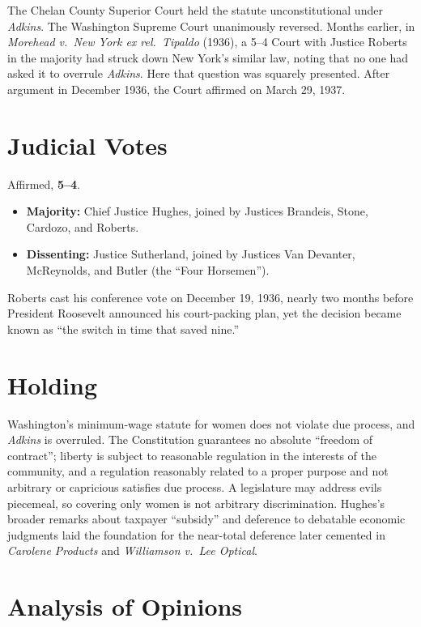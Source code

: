 \documentclass[12pt]{article}
\begin{document}
The Chelan County Superior Court held the statute unconstitutional under \textit{Adkins}. The Washington Supreme Court unanimously reversed. Months earlier, in \textit{Morehead v.\ New York ex rel.\ Tipaldo} (1936), a 5--4 Court with Justice Roberts in the majority had struck down New York's similar law, noting that no one had asked it to overrule \textit{Adkins}. Here that question was squarely presented. After argument in December 1936, the Court affirmed on March 29, 1937.

\section{Judicial Votes}

Affirmed, \textbf{5--4}.
\begin{itemize}
\item \textbf{Majority:} Chief Justice Hughes, joined by Justices Brandeis, Stone, Cardozo, and Roberts.
\item \textbf{Dissenting:} Justice Sutherland, joined by Justices Van Devanter, McReynolds, and Butler (the ``Four Horsemen'').
\end{itemize}
Roberts cast his conference vote on December 19, 1936, nearly two months before President Roosevelt announced his court-packing plan, yet the decision became known as ``the switch in time that saved nine.''

\section{Holding}

Washington's minimum-wage statute for women does not violate due process, and \textit{Adkins} is overruled. The Constitution guarantees no absolute ``freedom of contract''; liberty is subject to reasonable regulation in the interests of the community, and a regulation reasonably related to a proper purpose and not arbitrary or capricious satisfies due process. A legislature may address evils piecemeal, so covering only women is not arbitrary discrimination. Hughes's broader remarks about taxpayer ``subsidy'' and deference to debatable economic judgments laid the foundation for the near-total deference later cemented in \textit{Carolene Products} and \textit{Williamson v.\ Lee Optical}.

\section{Analysis of Opinions}
\end{document}
